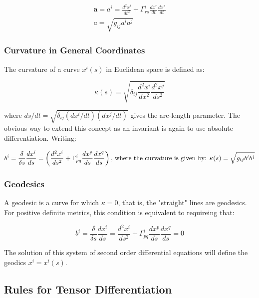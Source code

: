 \documentclass{article}
\begin{document}
\begin{align}
	\mathbf{ a } = a^i = \frac{ d^2 x^i }{ dt^2 } + \Gamma^i_{rs} \frac{ dx^r }{ dt } \frac{ dx^s }{ dt }\\
	a = \sqrt{ g_{ij} a^i a^j }
\end{align}


\subsubsection{Curvature in General Coordinates}

The curvature of a curve $x^i(s)$ in Euclidean space is defined as:

\begin{equation*}
	\kappa( s ) = \sqrt{ \delta_{ij} \frac{ d^2 x^i }{ dx^2 } \frac{ d^2 x^j }{ ds^2 } }
\end{equation*}

\noindent
where $ds/dt = \sqrt{ \delta_{ij}(dx^i/dt)(dx^j/dt)}$ gives the arc-length parameter.  The obvious way to extend this concept as an invariant is again to use absolute differentiation.  Writing:

\begin{equation}
	b^i = \frac{ \delta }{ \delta s } \frac{ dx^i }{ ds } = \left( \frac{ d^2 x^i }{ ds^2 } + \Gamma^i_{pq} \frac{ dx^p }{ ds } \frac{ dx^q }{ ds } \right)\\
	\text{, where the curvature is given by: }\\
	\kappa(s) = \sqrt{ g_{ij} b^i b^j }
\end{equation}


\subsubsection{Geodesics}

A geodesic is a curve for which $\kappa = 0$, that is, the "straight" lines are geodesics.  For positive definite metrics, this condition is equivalent to requireing that:

\begin{equation}
	b^i = \frac{ \delta }{ \delta s } \frac{ dx^i }{ ds } = \frac{ d^2 x^i }{ ds^2 } + \Gamma^i_{pq} \frac{ dx^p }{ ds } \frac{ dx^q }{ ds } = 0
\end{equation}

\noindent
The solution of this system of second order differential equations will define the geodics $x^i = x^i(s)$.

\subsection{Rules for Tensor Differentiation}
\end{document}

